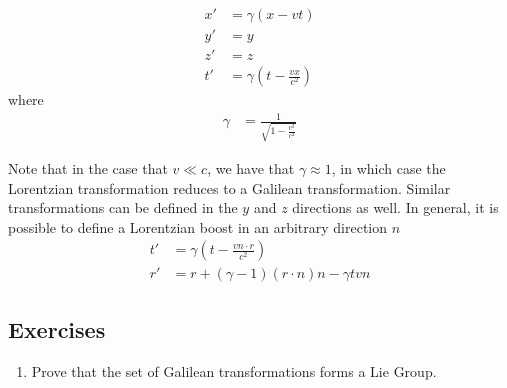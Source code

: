 \documentclass[book.tex]{subfiles}
\begin{document}
\begin{align}
    x' &= \gamma(x - vt) \\
    y' &= y \\
    z' &= z \\
    t' &= \gamma \left ( t - \frac{vx}{c^2} \right )
\end{align}
where
\begin{align}
\gamma &= \frac{1}{\sqrt{1 - \frac{v^2}{c^2}}}
\end{align}

Note that in the case that $v \ll c$, we have that $\gamma \approx 1$, in which case the Lorentzian transformation reduces to a Galilean transformation. Similar transformations can be defined in the $y$ and $z$ directions as well. In general, it is possible to define a Lorentzian boost in an arbitrary direction $n$
\begin{align}
    t' &= \gamma \left ( t - \frac{v n \cdot r}{c^2} \right ) \\
    r' &= r + (\gamma - 1)(r \cdot n)n - \gamma t v n
\end{align}
\subsection{Exercises}
\begin{enumerate}
    \item Prove that the set of Galilean transformations forms a Lie Group.
\end{enumerate}
\end{document}
